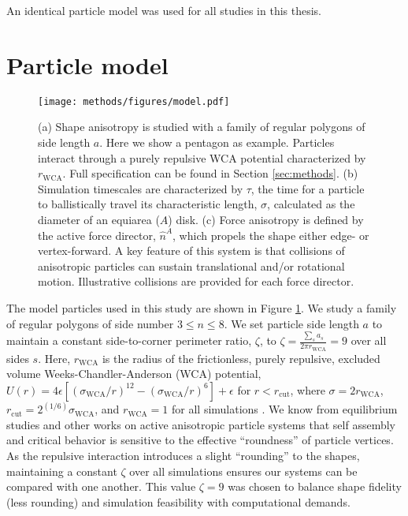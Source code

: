 An identical particle model was used for all studies in this thesis.

\section{Particle model}

\begin{figure}[t]
\begin{center}
\texttt{[image: methods/figures/model.pdf]}
\caption{
(a) Shape anisotropy is studied with a family of regular polygons of side length $a$.
Here we show a pentagon as example.
Particles interact through a purely repulsive WCA potential characterized by $r_\text{WCA}$.
Full specification can be found in Section \ref{sec:methods}.
(b) Simulation timescales are characterized by $\tau$, the time for a particle to ballistically travel its characteristic length, $\sigma$, calculated as the diameter of an equiarea ($A$) disk.
(c) Force anisotropy is defined by the active force director, $\hat{n}^A$, which propels the shape either edge- or vertex-forward.
A key feature of this system is that collisions of anisotropic particles can sustain translational and/or rotational motion.
Illustrative collisions are provided for each force director.
}
\label{fig:model}
\end{center}
\end{figure}


The model particles used in this study are shown in Figure \ref{fig:model}.
We study a family of regular polygons of side number $3{\leq}n{\leq}8$.
We set particle side length $a$ to maintain a constant side-to-corner perimeter ratio, $\zeta$, to $\zeta = \frac{\sum_s{a_s}}{2\pi r_\text{WCA}}=9$ over all sides $s$.
Here, $r_\text{WCA}$ is the radius of the frictionless, purely repulsive, excluded volume Weeks-Chandler-Anderson (WCA) potential, $U(r)=4\epsilon[(\sigma_\text{WCA}/r)^{12}-(\sigma_\text{WCA}/r)^6]+\epsilon$ for $r<r_\text{cut}$, where $\sigma=2r_\text{WCA}$, $r_\text{cut}=2^{(1/6)}\sigma_\text{WCA}$, and $r_\text{WCA}=1$ for all simulations \cite{WCA_1971}.
We know from equilibrium studies \cite{AvendanoEscobedo_2012_SoftMatter,Zhao_2011_PNAS,Zhao_2009_PRL} and other works on active anisotropic particle systems \cite{Prymidis_2016_SoftMatter} that self assembly and critical behavior is sensitive to the effective ``roundness'' of particle vertices.
As the repulsive interaction introduces a slight ``rounding'' to the shapes, maintaining a constant $\zeta$ over all simulations ensures our systems can be compared with one another.
This value $\zeta=9$ was chosen to balance shape fidelity (less rounding) and simulation feasibility with computational demands.

